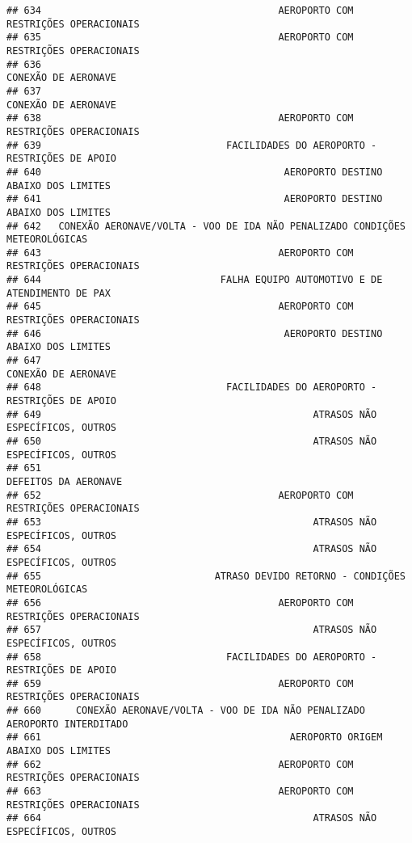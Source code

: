 \documentclass[
]{article}
\begin{document}
\begin{verbatim}
## 634                                         AEROPORTO COM RESTRIÇÕES OPERACIONAIS
## 635                                         AEROPORTO COM RESTRIÇÕES OPERACIONAIS
## 636                                                           CONEXÃO DE AERONAVE
## 637                                                           CONEXÃO DE AERONAVE
## 638                                         AEROPORTO COM RESTRIÇÕES OPERACIONAIS
## 639                                FACILIDADES DO AEROPORTO - RESTRIÇÕES DE APOIO
## 640                                          AEROPORTO DESTINO ABAIXO DOS LIMITES
## 641                                          AEROPORTO DESTINO ABAIXO DOS LIMITES
## 642   CONEXÃO AERONAVE/VOLTA - VOO DE IDA NÃO PENALIZADO CONDIÇÕES METEOROLÓGICAS
## 643                                         AEROPORTO COM RESTRIÇÕES OPERACIONAIS
## 644                               FALHA EQUIPO AUTOMOTIVO E DE ATENDIMENTO DE PAX
## 645                                         AEROPORTO COM RESTRIÇÕES OPERACIONAIS
## 646                                          AEROPORTO DESTINO ABAIXO DOS LIMITES
## 647                                                           CONEXÃO DE AERONAVE
## 648                                FACILIDADES DO AEROPORTO - RESTRIÇÕES DE APOIO
## 649                                               ATRASOS NÃO ESPECÍFICOS, OUTROS
## 650                                               ATRASOS NÃO ESPECÍFICOS, OUTROS
## 651                                                          DEFEITOS DA AERONAVE
## 652                                         AEROPORTO COM RESTRIÇÕES OPERACIONAIS
## 653                                               ATRASOS NÃO ESPECÍFICOS, OUTROS
## 654                                               ATRASOS NÃO ESPECÍFICOS, OUTROS
## 655                              ATRASO DEVIDO RETORNO - CONDIÇÕES METEOROLÓGICAS
## 656                                         AEROPORTO COM RESTRIÇÕES OPERACIONAIS
## 657                                               ATRASOS NÃO ESPECÍFICOS, OUTROS
## 658                                FACILIDADES DO AEROPORTO - RESTRIÇÕES DE APOIO
## 659                                         AEROPORTO COM RESTRIÇÕES OPERACIONAIS
## 660      CONEXÃO AERONAVE/VOLTA - VOO DE IDA NÃO PENALIZADO AEROPORTO INTERDITADO
## 661                                           AEROPORTO ORIGEM ABAIXO DOS LIMITES
## 662                                         AEROPORTO COM RESTRIÇÕES OPERACIONAIS
## 663                                         AEROPORTO COM RESTRIÇÕES OPERACIONAIS
## 664                                               ATRASOS NÃO ESPECÍFICOS, OUTROS

\end{verbatim}
\end{document}
